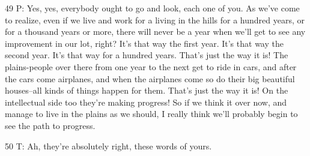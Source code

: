 49 P: Yes, yes, everybody ought to go and look, each one of you. As we've come
to realize, even if we live and work for a living in the hills for a hundred years,
or for a thousand years or more, there will never be a year when we'll get to see
any improvement in our lot, right? It's that way the first year. It's that way
the second year. It's that way for a hundred years. That's just the way it is!
The plains-people over there from one year to the next get to ride in cars, and
after the cars come airplanes, and when the airplanes come so do their big beautiful
houses--all kinds of things happen for them. That's just the way it is! On the
intellectual side too they're making progress! So if we think it over now, and
manage to live in the plains as we should, I really think we'll probably begin
to see the path to progress.

50 T: Ah, they're absolutely right, these words of yours.

